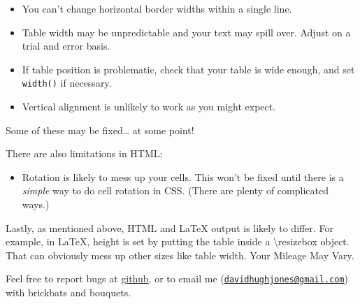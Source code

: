\documentclass[]{article}
\providecommand{\tightlist}{%
  \setlength{\itemsep}{0pt}\setlength{\parskip}{0pt}}
\begin{document}
\begin{itemize}
\tightlist
\item
  You can't change horizontal border widths within a single line.
\item
  Table width may be unpredictable and your text may spill over. Adjust
  on a trial and error basis.
\item
  If table position is problematic, check that your table is wide
  enough, and set \texttt{width()} if necessary.
\item
  Vertical alignment is unlikely to work as you might expect.
\end{itemize}

Some of these may be fixed\ldots{} at some point!

There are also limitations in HTML:

\begin{itemize}
\tightlist
\item
  Rotation is likely to mess up your cells. This won't be fixed until
  there is a \emph{simple} way to do cell rotation in CSS. (There are
  plenty of complicated ways.)
\end{itemize}

Lastly, as mentioned above, HTML and LaTeX output is likely to differ.
For example, in LaTeX, height is set by putting the table inside a
\textbackslash{}resizebox object. That can obviously mess up other sizes
like table width. Your Mileage May Vary.

Feel free to report bugs at
\href{https://github.com/hughjonesd/huxtable/issues}{github}, or to
email me
(\href{mailto:davidhughjones@gmail.com}{\nolinkurl{davidhughjones@gmail.com}})
with brickbats and bouquets.
\end{document}
